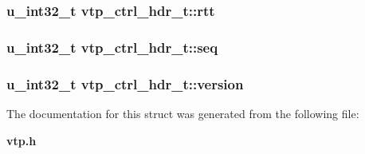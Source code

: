 \subsubsection{\setlength{\rightskip}{0pt plus 5cm}u\_\-int32\_\-t {\bf vtp\_\-ctrl\_\-hdr\_\-t::rtt}}\label{structvtp__ctrl__hdr__t_o6}


\subsubsection{\setlength{\rightskip}{0pt plus 5cm}u\_\-int32\_\-t {\bf vtp\_\-ctrl\_\-hdr\_\-t::seq}}\label{structvtp__ctrl__hdr__t_o2}


\subsubsection{\setlength{\rightskip}{0pt plus 5cm}u\_\-int32\_\-t {\bf vtp\_\-ctrl\_\-hdr\_\-t::version}}\label{structvtp__ctrl__hdr__t_o0}




The documentation for this struct was generated from the following file:\begin{CompactItemize}
\item 
{\bf vtp.h}\end{CompactItemize}
